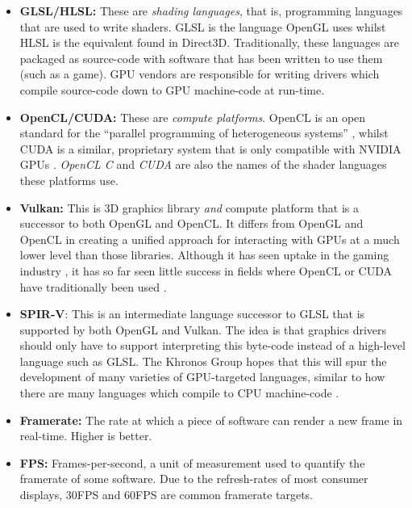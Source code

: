 \documentclass[a4paper,12pt,twoside,openright]{report}
\begin{document}
\begin{itemize}
    \item \textbf{GLSL/HLSL:} These are \textit{shading languages}, that is,
    programming languages that are used to write shaders. GLSL is the language
    OpenGL uses whilst HLSL is the equivalent found in Direct3D. Traditionally,
    these languages are packaged as source-code with software that has been
    written to use them (such as a game). GPU vendors are responsible for
    writing drivers which compile source-code down to GPU machine-code at
    run-time.

    \item \textbf{OpenCL/CUDA:} These are \textit{compute platforms}. OpenCL is
    an open standard for the ``parallel programming of heterogeneous systems''
    \cite{OpenCL}, whilst CUDA is a similar, proprietary system that is only
    compatible with NVIDIA GPUs \cite{CUDA}. \textit{OpenCL C} and
    \textit{CUDA} are also the names of the shader languages these platforms
    use.

    \item \textbf{Vulkan:} This is 3D graphics library \textit{and} compute
    platform \cite{Vulkan} that is a successor to both OpenGL and OpenCL. It
    differs from OpenGL and OpenCL in creating a unified approach for
    interacting with GPUs at a much lower level than those libraries. Although
    it has seen uptake in the gaming industry \cite{TODO}, it has so far seen
    little success in fields where OpenCL or CUDA have traditionally been used
    \cite{TODO}.

    \item \textbf{SPIR-V}: This is an intermediate language successor to GLSL
    that is supported by both OpenGL and Vulkan. The idea is that graphics
    drivers should only have to support interpreting this byte-code instead of
    a high-level language such as GLSL. The Khronos Group hopes that this will
    spur the development of many varieties of GPU-targeted languages, similar
    to how there are many languages which compile to CPU machine-code
    \cite{TODO}.

    \item \textbf{Framerate:} The rate at which a piece of software can render
    a new frame in real-time. Higher is better.

    \item \textbf{FPS:} Frames-per-second, a unit of measurement used to
    quantify the framerate of some software. Due to the refresh-rates of most
    consumer displays, 30FPS and 60FPS are common framerate targets.

\end{itemize}
\end{document}
